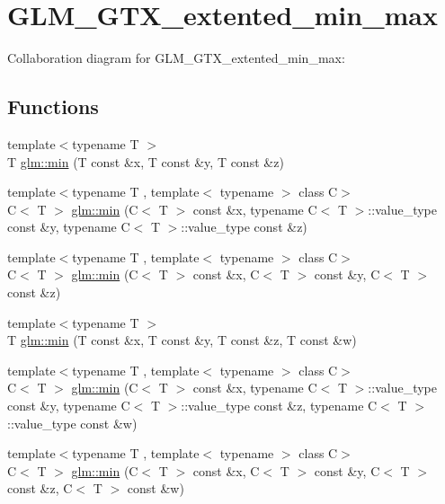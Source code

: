 \hypertarget{group__gtx__extented__min__max}{}\section{G\+L\+M\+\_\+\+G\+T\+X\+\_\+extented\+\_\+min\+\_\+max}
\label{group__gtx__extented__min__max}
Collaboration diagram for G\+L\+M\+\_\+\+G\+T\+X\+\_\+extented\+\_\+min\+\_\+max\+:
\subsection*{Functions}
\begin{DoxyCompactItemize}
\item 
{\footnotesize template$<$typename T $>$ }\\T \hyperlink{group__gtx__extented__min__max_gaa8615e92f9e0fd6561ff55ed6f1e0552}{glm\+::min} (T const \&x, T const \&y, T const \&z)
\item 
{\footnotesize template$<$typename T , template$<$ typename $>$ class C$>$ }\\C$<$ T $>$ \hyperlink{group__gtx__extented__min__max_ga538f32ce393e8d88e57d426299c11dbe}{glm\+::min} (C$<$ T $>$ const \&x, typename C$<$ T $>$\+::value\+\_\+type const \&y, typename C$<$ T $>$\+::value\+\_\+type const \&z)
\item 
{\footnotesize template$<$typename T , template$<$ typename $>$ class C$>$ }\\C$<$ T $>$ \hyperlink{group__gtx__extented__min__max_gaaf6116a1a1336637fae81c776931d6a2}{glm\+::min} (C$<$ T $>$ const \&x, C$<$ T $>$ const \&y, C$<$ T $>$ const \&z)
\item 
{\footnotesize template$<$typename T $>$ }\\T \hyperlink{group__gtx__extented__min__max_ga66d6335250659e47aebbc7ed3b9f02e3}{glm\+::min} (T const \&x, T const \&y, T const \&z, T const \&w)
\item 
{\footnotesize template$<$typename T , template$<$ typename $>$ class C$>$ }\\C$<$ T $>$ \hyperlink{group__gtx__extented__min__max_ga01e1772c215d5f0a0ac509e452171c2e}{glm\+::min} (C$<$ T $>$ const \&x, typename C$<$ T $>$\+::value\+\_\+type const \&y, typename C$<$ T $>$\+::value\+\_\+type const \&z, typename C$<$ T $>$\+::value\+\_\+type const \&w)
\item 
{\footnotesize template$<$typename T , template$<$ typename $>$ class C$>$ }\\C$<$ T $>$ \hyperlink{group__gtx__extented__min__max_ga9a01347f2741d9b08c0b09027044281d}{glm\+::min} (C$<$ T $>$ const \&x, C$<$ T $>$ const \&y, C$<$ T $>$ const \&z, C$<$ T $>$ const \&w)

\end{DoxyCompactItemize}
